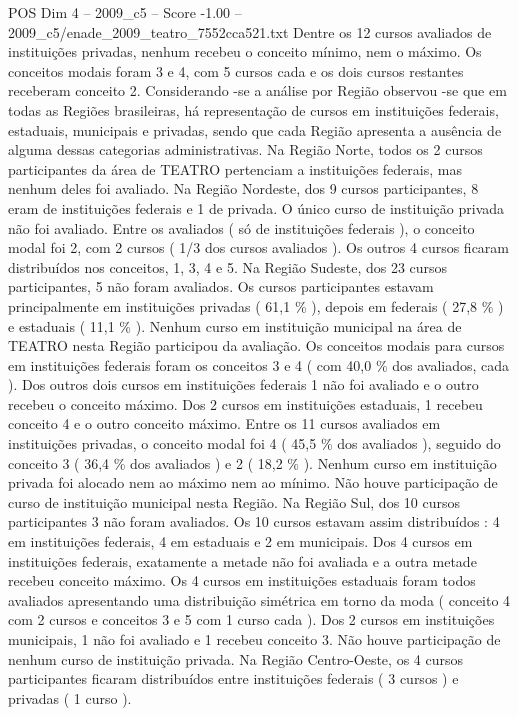 \begin{textsample}{POS Dim 4 – 2009\_c5 – Score -1.00 – 2009\_c5/enade\_2009\_teatro\_7552cca521.txt}
Dentre os 12 cursos avaliados de instituições privadas, nenhum recebeu o conceito mínimo, nem o máximo.
Os conceitos modais foram 3 e 4, com 5 cursos cada e os dois cursos restantes receberam conceito 2.
Considerando -se a análise por Região observou -se que em todas as Regiões brasileiras, há representação de cursos em instituições federais, estaduais, municipais e privadas, sendo que cada Região apresenta a ausência de alguma dessas categorias administrativas.
Na Região Norte, todos os 2 cursos participantes da área de TEATRO pertenciam a instituições federais, mas nenhum deles foi avaliado.
Na Região Nordeste, dos 9 cursos participantes, 8 eram de instituições federais e 1 de privada.
O único curso de instituição privada não foi avaliado.
Entre os avaliados ( só de instituições federais ), o conceito modal foi 2, com 2 cursos ( 1/3 dos cursos avaliados ).
Os outros 4 cursos ficaram distribuídos nos conceitos, 1, 3, 4 e 5.
Na Região Sudeste, dos 23 cursos participantes, 5 não foram avaliados.
Os cursos participantes estavam principalmente em instituições privadas ( 61,1 \% ), depois em federais ( 27,8 \% ) e estaduais ( 11,1 \% ).
Nenhum curso em instituição municipal na área de TEATRO nesta Região participou da avaliação.
Os conceitos modais para cursos em instituições federais foram os conceitos 3 e 4 ( com 40,0 \% dos avaliados, cada ).
Dos outros dois cursos em instituições federais 1 não foi avaliado e o outro recebeu o conceito máximo.
Dos 2 cursos em instituições estaduais, 1 recebeu conceito 4 e o outro conceito máximo.
Entre os 11 cursos avaliados em instituições privadas, o conceito modal foi 4 ( 45,5 \% dos avaliados ), seguido do conceito 3 ( 36,4 \% dos avaliados ) e 2 ( 18,2 \% ).
Nenhum curso em instituição privada foi alocado nem ao máximo nem ao mínimo.
Não houve participação de curso de instituição municipal nesta Região.
Na Região Sul, dos 10 cursos participantes 3 não foram avaliados.
Os 10 cursos estavam assim distribuídos : 4 em instituições federais, 4 em estaduais e 2 em municipais.
Dos 4 cursos em instituições federais, exatamente a metade não foi avaliada e a outra metade recebeu conceito máximo.
Os 4 cursos em instituições estaduais foram todos avaliados apresentando uma distribuição simétrica em torno da moda ( conceito 4 com 2 cursos e conceitos 3 e 5 com 1 curso cada ).
Dos 2 cursos em instituições municipais, 1 não foi avaliado e 1 recebeu conceito 3.
Não houve participação de nenhum curso de instituição privada.
Na Região Centro-Oeste, os 4 cursos participantes ficaram distribuídos entre instituições federais ( 3 cursos ) e privadas ( 1 curso ).

\end{textsample}
